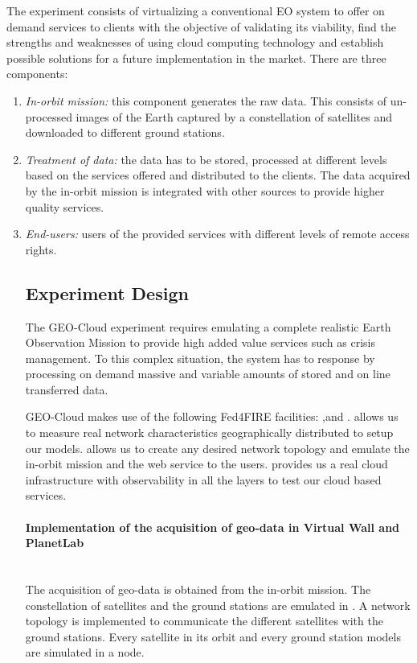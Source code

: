 The experiment consists of virtualizing a conventional EO system to offer on
demand services to clients with the objective of validating its viability, find
the strengths and weaknesses of using cloud computing technology and establish
possible solutions for a future implementation in the market. There are three
components:
\begin{enumerate}
\item \emph{In-orbit mission:} this component generates the raw data. This consists of un-processed images of the Earth captured by a constellation of satellites and downloaded to different ground stations. 
\item \emph{Treatment of data:} the data has to be stored, processed at different levels based on the services offered and distributed to the clients. The data acquired by the in-orbit mission is integrated with other sources to provide higher quality services.
\item \emph{End-users:} users of the provided services with different levels of remote access rights. 




\subsection{Experiment Design}


The GEO-Cloud experiment requires emulating a complete realistic Earth Observation Mission to provide high added value services such as crisis management. To this complex situation, the system has to response by processing on demand massive and variable amounts of stored and on line transferred data.

GEO-Cloud makes use of the following Fed4FIRE facilities: \pl,\vw and
\bonfire. \pl allows us to measure real network characteristics geographically
distributed to setup our models. \vw allows us to create any desired network
topology and emulate the in-orbit mission and the web service to the
users. \bonfire provides us a real cloud infrastructure with observability in
all the layers to test our cloud based services.


\paragraph{Implementation of the acquisition of geo-data in Virtual Wall and
  PlanetLab}~\\

The acquisition of geo-data is obtained from the in-orbit mission. The
constellation of satellites and the ground stations are emulated in \vw. A
network topology is implemented to communicate the different satellites with the ground stations. Every satellite in its orbit and every ground station models are simulated in a node. 


\end{enumerate}
